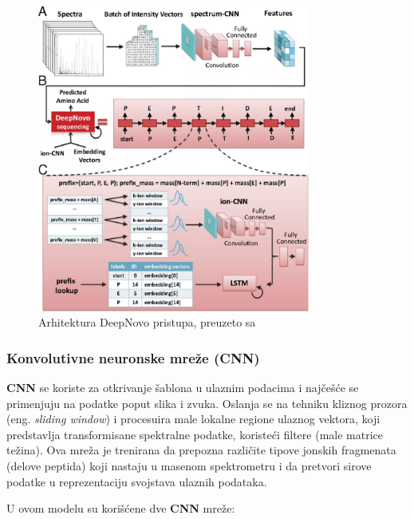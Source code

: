 \documentclass[12pt,oneside]{memoir}
\begin{document}
\begin{figure}[h]
\centering
\includegraphics[width=0.8\textwidth]{images/deep_novo_architecture.jpeg}
\caption{Arhitektura DeepNovo pristupa, preuzeto sa \cite{deepnovo}}
\label{fig:arhitektura}
\end{figure}

\subsubsection{Konvolutivne neuronske mreže (CNN)}
\textbf{CNN} se koriste za otkrivanje šablona u ulaznim podacima i najčešće se primenjuju na podatke poput slika i zvuka. Oslanja se na tehniku kliznog prozora (eng. \emph{sliding window}) i procesuira male lokalne regione ulaznog vektora, koji predstavlja transformisane spektralne podatke, koristeći filtere (male matrice težina). Ova mreža je trenirana da prepozna različite tipove jonskih fragmenata (delove peptida) koji nastaju u masenom spektrometru i da pretvori sirove podatke u reprezentaciju svojstava ulaznih podataka.

U ovom modelu su korišćene dve \textbf{CNN} mreže:
\end{document}
